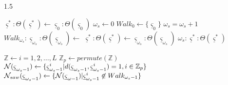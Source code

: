 \begin{algorithm-wide}[h]{1.5\textwidth}
\begin{footnotesize}
\vspace{0.2cm}
\begin{minipage}[!T]{0.49\linewidth}
\begin{algorithmic}[1]
    \STATE ${\underline \varsigma^*}\!:\!\Theta({\underline \varsigma^*}) \gets {\underline \varsigma}_0\!:\!\Theta({\underline \varsigma}_0)$
\ENDIF
\STATE $\omega_{s} \gets 0$     
\STATE $Walk_{0} \gets \{ {\underline \varsigma}_0 \}$
    \ENDIF
    \STATE $\omega_{s}=\omega_{s}+1$
    \STATE $Walk_{\omega_{s}}\!:\!{\underline \varsigma}_{\omega_{s}}\!:\!\Theta({\underline \varsigma}_{\omega_{s}}) \gets$
       \STATE ${\underline \varsigma^*}\!:\!\Theta({\underline \varsigma^*}) \gets {\underline \varsigma_{\omega_{s}}}\!:\!\Theta({\underline \varsigma}_{\omega_{s}})$
     \ENDIF
\ENDWHILE
{} $\omega_{s}\!:\!{\underline \varsigma^*}\!:\!\Theta({\underline \varsigma^*})$
\ENDPROCEDURE
\end{algorithmic}
\end{minipage}
\begin{minipage}[!T]{0.49\linewidth}
\label{alg-global-search2-wide-c}
\begin{algorithmic}[1]
\STATE $\mathbb{Z} \gets i = 1,2, \ldots ,L $ 
\STATE $\mathbb{Z}_p \gets permute(\mathbb{Z}) $ 
\STATE ${\cal N} ({\underline \varsigma}_{\omega_{s} -1}) \gets  \{{\underline \varsigma}_{\omega_{s} -1}^i | d({\underline \varsigma}_{\omega_{s} -1}, {\underline \varsigma}_{\omega_{s} -1}^i ) = 1, i \in \mathbb{Z}_p\}$ 
\STATE ${\cal N}_{saw} ({\underline \varsigma}_{\omega_{s} -1}) \gets  \{ {\cal N} ({\underline \varsigma}_{\omega -1}) |
                      {\underline \varsigma}_{\omega_{s} -1}^i \not\in  Walk_{\omega_{s} -1}\}$

\end{algorithmic}
\end{minipage}
\end{footnotesize}
\end{algorithm-wide}
